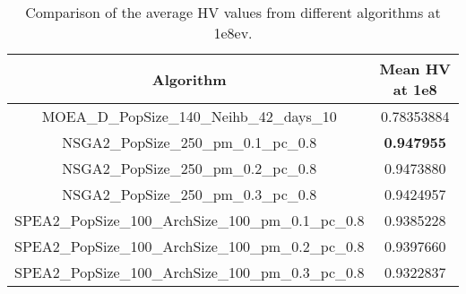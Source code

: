 \begin{table}[!ht]
\centering
\begin{tabular}{|c|c|}
\hline
\textbf{Algorithm} & \textbf{Mean HV at 1e8} \\ \hline
MOEA\_D\_PopSize\_140\_Neihb\_42\_days\_10 & 0.78353884 \\ \hline
NSGA2\_PopSize\_250\_pm\_0.1\_pc\_0.8 & \textbf{0.947955} \\ \hline
NSGA2\_PopSize\_250\_pm\_0.2\_pc\_0.8 & 0.9473880 \\ \hline
NSGA2\_PopSize\_250\_pm\_0.3\_pc\_0.8 & 0.9424957 \\ \hline
SPEA2\_PopSize\_100\_ArchSize\_100\_pm\_0.1\_pc\_0.8 & 0.9385228 \\ \hline
SPEA2\_PopSize\_100\_ArchSize\_100\_pm\_0.2\_pc\_0.8 & 0.9397660 \\ \hline
SPEA2\_PopSize\_100\_ArchSize\_100\_pm\_0.3\_pc\_0.8 & 0.9322837 \\ \hline
\end{tabular}
\caption{Comparison of the average HV values from different algorithms at 1e8ev.}
\label{table:compare}
\end{table}